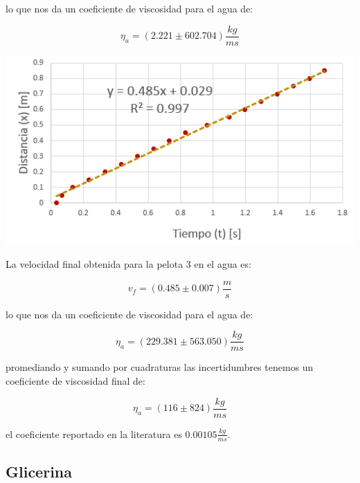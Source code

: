 \documentclass[DIV=calc, paper=a4, fontsize=11pt]{scrartcl}
\newenvironment{Figura}
  {\par\medskip\noindent\minipage{\linewidth}}
  {\endminipage\par\medskip}
\begin{document}
\begin{multicols}{2}
lo que nos da un coeficiente de viscosidad para el agua de:

\begin{equation*}
    \eta_{a} = (2.221 \pm 602.704) \frac{kg}{ms}
\end{equation*}

\begin{Figura}
\centering
    \includegraphics[width=1\textwidth]{graficas/3 agua.PNG}
    \label{fig}
\end{Figura}

La velocidad final obtenida para la pelota 3 en el agua es:

\begin{equation*}
    v_f = (0.485 \pm 0.007) \frac{m}{s}
\end{equation*}

lo que nos da un coeficiente de viscosidad para el agua de:

\begin{equation*}
    \eta_{a} = (229.381 \pm 563.050) \frac{kg}{ms}
\end{equation*}

promediando y sumando por cuadraturas las incertidumbres tenemos un coeficiente de viscosidad final de:

\begin{equation*}
    \eta_{a} = (116 \pm 824 ) \frac{kg}{ms}
\end{equation*}

el coeficiente reportado en la literatura es $0.00105 \frac{kg}{ms}$.


\subsection*{Glicerina}


\end{multicols}
\end{document}
